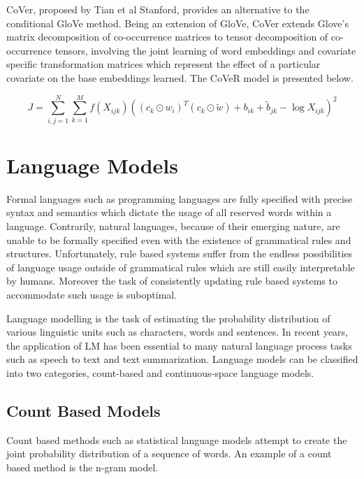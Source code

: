 \noindent
\newline
CoVer, proposed by Tian et al Stanford, provides an alternative to the conditional GloVe method. Being an extension of GloVe, CoVer extends Glove's matrix decomposition of co-occurrence matrices to tensor decomposition of co-occurrence tensors, involving the joint learning of word embeddings and covariate specific transformation matrices which represent the effect of a particular covariate on the base embeddings learned. The CoVeR model is presented below.

\begin{equation}
J = \sum_{i, j=1}^{N} \sum_{k=1}^{M} f(X_{ijk}) ((c_{k} \odot w_{i})^{T} (c_{k} \odot \tilde{w}) + b_{ik} + \tilde{b}_{jk} - \log{X_{ijk}})^{2}
\end{equation}


\section{Language Models}
Formal languages such as programming languages are fully specified with precise syntax and semantics which dictate the usage of all reserved words within a language. Contrarily, natural languages, because of their emerging nature, are unable to be formally specified even with the existence of grammatical rules and structures. Unfortunately, rule based systems suffer from the endless possibilities of language usage outside of grammatical rules which are still easily interpretable by humans. Moreover the task of consistently updating rule based systems to accommodate such usage is suboptimal.  

\noindent
\newline
Language modelling is the task of estimating the probability distribution of various linguistic units such as characters, words and sentences. In recent years, the application of LM  has been essential to many natural language process tasks such as speech to text and text summarization. Language models can be classified into two categories, count-based and continuous-space language models. 

\subsection{Count Based Models}
Count based methods such as statistical language models attempt to create the joint probability distribution of a sequence of words. An example of a count based method is the n-gram model.

